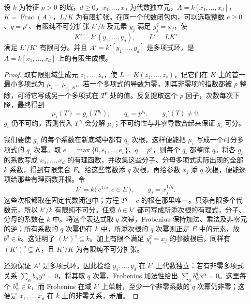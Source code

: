 \begin{lemma}\label{b3:lem:finite-purely-inseparable-base-change}
	设 \(k\) 为特征 \(p>0\) 的域，\(d\ge0\)，\(x_1,\ldots,x_d\) 为代数独立元，\(A=k[x_1,\ldots,x_d]\)，\(K=\operatorname{Frac}(A)\)，\(L/K\) 为有限扩张。在同一个代数闭包内，可以选取整数 \(e\ge0\)、\(q=p^e\)、有限纯不可分扩张 \(k'/k\) 及元素 \(y_j\) 满足 \(y_j^q=x_j\)，使
	\[
		K'=k'(y_1,\ldots,y_d),\qquad L'=LK'
	\]
	满足 \(L'/K'\) 有限可分。并且 \(A'=k'[y_1,\ldots,y_d]\) 是多项式环，是 \(A=k[x_1,\ldots,x_d]\) 上的有限生成模。
\end{lemma}
\begin{proof}
	取有限组域生成元 \(z_1,\ldots,z_s\)，使 \(L=K(z_1,\ldots,z_s)\)，记它们在 \(K\) 上的首一最小多项式为 \(\mu_i=\mu_{z_i,K}\)。若一个多项式的导数为零，则其非零项的指数都被 \(p\) 整除，可将它写成另一个多项式在 \(T^p\) 处的值。反复提取这个 \(p\) 因子，次数每次下降，最终得到
	\[
		\mu_i(T)=g_i(T^{q_i}),\qquad q_i=p^{e_i},\qquad g_i'(T)\ne0.
	\]
	\(g_i\) 仍不可约，否则代入 \(T^{q_i}\) 会分解 \(\mu_i\)；不可约性与非零导数合起来保证 \(g_i\) 可分。

	我们要使 \(g_i\) 的每个系数在新底域中都有 \(q_i\) 次根，这样便能把 \(\mu_i\) 写成一个可分多项式的 \(q_i\) 次幂。取 \(e=\max\{0,e_1,\ldots,e_s\}\)、\(q=p^e\)，则每个 \(q_i\) 都整除 \(q\)。将各 \(g_i\) 的系数写成 \(x_1,\ldots,x_d\) 的有理函数，并收集这些分子、分母多项式实际出现的全部 \(k\) 系数，得到有限集合 \(E\)。给这些常数添 \(q\) 次根，再给参数 \(x_j\) 添 \(q\) 次根，便能逐项给那些有理函数开根。令
	\[
		k'=k\bigl(\,c^{1/q}:c\in E\,\bigr),\qquad y_j=x_j^{1/q}.
	\]
	这些次根都取在固定代数闭包中；方程 \(T^q-c\) 的根在那里唯一。只添有限多个代数元，所以 \(k'/k\) 有限纯不可分。任意 \(b\in k'\) 都可写成所添次根的有理式，分子、分母的系数在 \(k\) 中。将这个表达式取 \(q\) 次幂，Frobenius 保持加法、乘法及非零元的逆；所有系数的 \(q\) 次幂仍在 \(k\) 中，所添次根的 \(q\) 次幂则正是 \(E\) 中的元素，故 \(b^q\in k\)。这证明了 \((k')^q\subseteq k\)。加上有限个满足 \(y_j^q=x_j\) 的参数根后，同样有 \((K')^q\subseteq K\)，且 \(K'/K\) 为有限纯不可分扩张。

	还须保证 \(A'\) 是多项式环。因此检验 \(y_1,\ldots,y_d\) 在 \(k'\) 上代数独立：若有非零多项式关系 \(\sum_\alpha b_\alpha y^\alpha=0\)，将其取 \(q\) 次幂，Frobenius 加法性给出 \(\sum_\alpha b_\alpha^q x^\alpha=0\)。这里每个 \(b_\alpha^q\in k\)，而 Frobenius 在域 \(k'\) 上单射，至少一个非零系数的 \(q\) 次幂仍非零；这便是 \(x_1,\ldots,x_d\) 在 \(k\) 上的非零关系，矛盾。


\end{proof}
